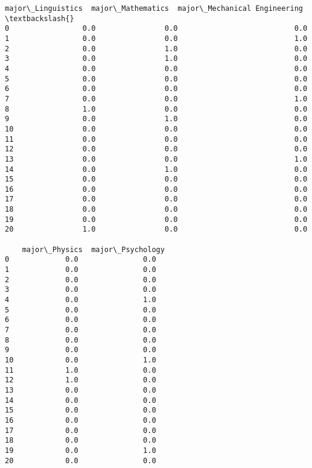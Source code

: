 \documentclass[11pt]{article}
\begin{document}
\begin{tcolorbox}[breakable, size=fbox, boxrule=.5pt, pad at break*=1mm, opacityfill=0]
\begin{Verbatim}[commandchars=\\\{\}]
    major\_Linguistics  major\_Mathematics  major\_Mechanical Engineering  \textbackslash{}
0                 0.0                0.0                           0.0
1                 0.0                0.0                           1.0
2                 0.0                1.0                           0.0
3                 0.0                1.0                           0.0
4                 0.0                0.0                           0.0
5                 0.0                0.0                           0.0
6                 0.0                0.0                           0.0
7                 0.0                0.0                           1.0
8                 1.0                0.0                           0.0
9                 0.0                1.0                           0.0
10                0.0                0.0                           0.0
11                0.0                0.0                           0.0
12                0.0                0.0                           0.0
13                0.0                0.0                           1.0
14                0.0                1.0                           0.0
15                0.0                0.0                           0.0
16                0.0                0.0                           0.0
17                0.0                0.0                           0.0
18                0.0                0.0                           0.0
19                0.0                0.0                           0.0
20                1.0                0.0                           0.0

    major\_Physics  major\_Psychology
0             0.0               0.0
1             0.0               0.0
2             0.0               0.0
3             0.0               0.0
4             0.0               1.0
5             0.0               0.0
6             0.0               0.0
7             0.0               0.0
8             0.0               0.0
9             0.0               0.0
10            0.0               1.0
11            1.0               0.0
12            1.0               0.0
13            0.0               0.0
14            0.0               0.0
15            0.0               0.0
16            0.0               0.0
17            0.0               0.0
18            0.0               0.0
19            0.0               1.0
20            0.0               0.0
\end{Verbatim}
\end{tcolorbox}
        
    
\end{document}
